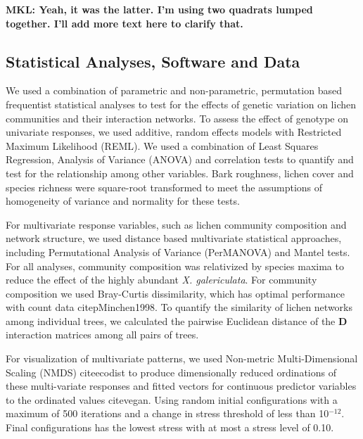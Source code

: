 \documentclass[11pt,twocolumn,twoside,lineno]{pnas-new}
\begin{document}
{\textbf{MKL: Yeah, it was the latter. I'm using two quadrats lumped
  together. I'll add more text here to clarify that.}


\subsection*{Statistical Analyses, Software and Data}

We used a combination of parametric and non-parametric, permutation
based frequentist statistical analyses to test for the effects of
genetic variation on lichen communities and their interaction
networks. To assess the effect of genotype on univariate responses, we
used additive, random effects models with Restricted Maximum
Likelihood (REML). We used a combination of Least Squares Regression,
Analysis of Variance (ANOVA) and correlation tests to quantify and
test for the relationship among other variables. Bark roughness,
lichen cover and species richness were square-root transformed to meet
the assumptions of homogeneity of variance and normality for these
tests.



For multivariate response variables, such as lichen community
composition and network structure, we used distance based multivariate
statistical approaches, including Permutational Analysis of Variance
(PerMANOVA) and Mantel tests. For all analyses, community composition
was relativized by species maxima to reduce the effect of the highly
abundant \textit{X. galericulata}. For community composition we used
Bray-Curtis dissimilarity, which has optimal performance with count
data citep{Minchen1998}. To quantify the similarity of lichen
networks among individual trees, we calculated the pairwise Euclidean
distance of the $\mathbf{D}$ interaction matrices among all pairs of
trees.

For visualization of multivariate patterns, we used Non-metric
Multi-Dimensional Scaling (NMDS) cite{ecodist} to produce
dimensionally reduced ordinations of these multi-variate responses and
fitted vectors for continuous predictor variables to the ordinated
values cite{vegan}. Using random initial configurations with a
maximum of 500 iterations and a change in stress threshold of less
than 10$^{-12}$. Final configurations has the lowest stress with at
most a stress level of 0.10.


}
\end{document}
